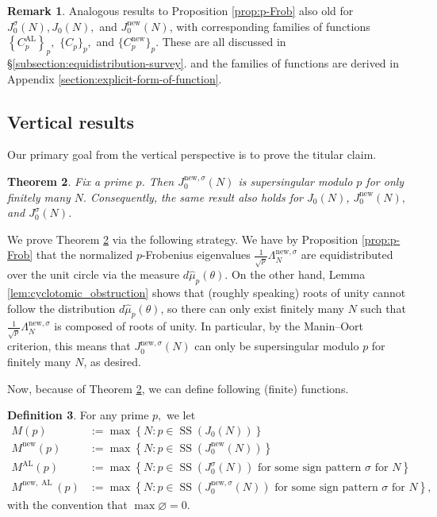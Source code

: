 \documentclass[11pt,letterpaper,reqno]{amsart}
\newtheorem{theorem}{Theorem}[section]
\theoremstyle{definition}
\newtheorem{definition}[theorem]{Definition}
\newtheorem{remark}[theorem]{Remark}
\numberwithin{equation}{section}
\numberwithin{figure}{section}
\numberwithin{table}{section}
\let\subsectiontemp\subsection
\renewcommand{\subsection}[1]{ 
    \subsectiontemp{#1} \hfill\vspace{0.5\linespacing} 
}
\newcommand{\nw}{\mathrm{new}}
\begin{document}
\begin{remark}
    Analogous results to Proposition \ref{prop:p-Frob} also old for $J_0^{\sigma}(N), J_0(N),$ and $J_0^{\nw}(N)$, with corresponding families of functions $\left\{C_p^{\operatorname{AL}}\right\}_p,$ $\{C_p\}_p,$ and $\{C_p^\nw\}_p.$ These are all discussed in \S\ref{subsection:equidistribution-survey}. and the families of functions are derived in Appendix \ref{section:explicit-form-of-function}.
\end{remark}



\subsection{Vertical results}\label{subsection:vertical-results}

Our primary goal from the vertical perspective is to prove the titular claim.
\begin{theorem}\label{thm:finiteness-of-supersingularity}
    Fix a prime $p$. Then $J_0^{\nw, \sigma}(N)$ is supersingular modulo $p$ for only finitely many $N.$
    Consequently, the same result also holds for $J_0(N)$, $J_0^\nw(N),$ and $J_0^{\sigma}(N)$.
\end{theorem}
We prove Theorem \ref{thm:finiteness-of-supersingularity} via the following strategy. 
We have by Proposition \ref{prop:p-Frob} that the normalized $p$-Frobenius eigenvalues $\frac{1}{\sqrt p} \Lambda_N^{\nw, \sigma}$ are equidistributed over the unit circle via the measure $d\hat{\mu}_p(\theta)$. On the other hand, Lemma \ref{lem:cyclotomic_obstruction} shows that (roughly speaking) roots of unity cannot follow the distribution $d\hat{\mu}_p(\theta)$, so there can only exist finitely many $N$ such that $\frac{1}{\sqrt{p}} \Lambda_N^{\nw, \sigma}$ is composed of roots of unity. In particular, by the Manin--Oort criterion, this means that $J_0^{\mathrm{new},\sigma}(N)$ can only be supersingular modulo $p$ for finitely many $N$, as desired. 


Now, because of Theorem \ref{thm:finiteness-of-supersingularity}, we can define following (finite) functions.

\begin{definition}\label{defn:M(p)}
    For any prime $p,$ we let
\begin{align}
    M(p) &:=  \max \left\{ N  : p \in \operatorname{SS}\!\left(J_0(N) \right)  \right\}\\
    M^{\nw}(p) &:= \max \left\{ N  : p \in \operatorname{SS}\!\left(J_0^\nw(N) \right)  \right\}\\
    M^{\operatorname{AL}}(p) &:= \max \left\{ N  : p \in \operatorname{SS}\!\left(J_0^\sigma(N) \right) \text{ for some sign pattern $\sigma$ for $N$} \right\}\\
    M^{\nw, \operatorname{AL}}(p) &:= \max \left\{ N  : p \in \operatorname{SS}\!\left(J_0^{\nw, \sigma}(N) \right) \text{ for some sign pattern $\sigma$ for $N$} \right\},
\end{align}
with the convention that $\max \varnothing = 0.$
\end{definition}
\end{document}
